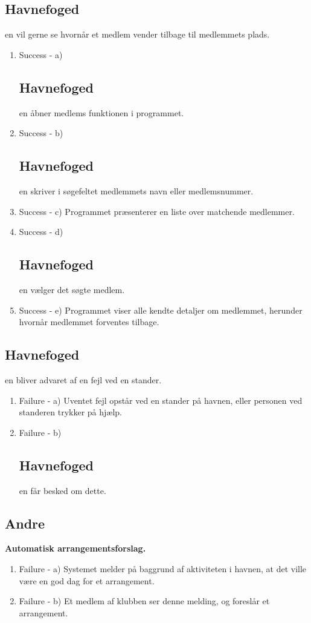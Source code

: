 {{{{	\item{\bf{\subsection{Havnefoged}en vil gerne se hvornår et medlem vender tilbage til medlemmets plads.}}
	  \begin{enumerate}
			\item Success -  a) \subsection{Havnefoged}en åbner medlems funktionen i programmet.
			\item Success -  b) \subsection{Havnefoged}en skriver i søgefeltet medlemmets navn eller medlemsnummer.
			\item Success -  c) Programmet præsenterer en liste over matchende medlemmer.
			\item Success -  d) \subsection{Havnefoged}en vælger det søgte medlem.
			\item Success -  e) Programmet viser alle kendte detaljer om medlemmet, herunder hvornår medlemmet forventes tilbage.
	   \end{enumerate}
	   
	\item{\bf{\subsection{Havnefoged}en bliver advaret af en fejl ved en stander.}}
	  \begin{enumerate}
			\item Failure -  a) Uventet fejl opstår ved en stander på havnen, eller personen ved standeren trykker på hjælp.
			\item Failure -  b) \subsection{Havnefoged}en får besked om dette.
	   \end{enumerate}
	   
\subsection{Andre}
	\item{\bf{Automatisk arrangementsforslag.}}
	  \begin{enumerate}
			\item Failure -  a) Systemet melder på baggrund af aktiviteten i havnen, at det ville være en god dag for et arrangement.
			\item Failure -  b) Et medlem af klubben ser denne melding, og foreslår et arrangement.
	   \end{enumerate}
      
}}}}
